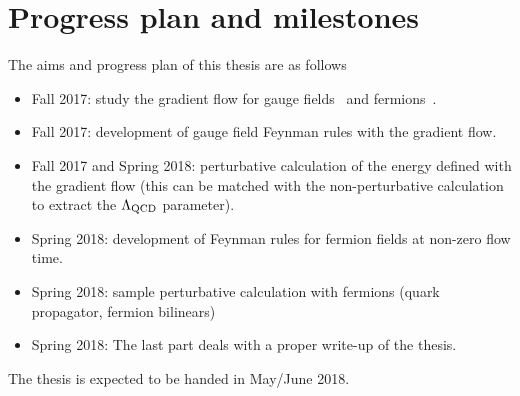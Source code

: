 \documentclass[aps,prc,twocolumn,showpacs,floatfix,nofootinbib,preprintnumbers,superscriptaddress,amsmath,amssymb]{revtex4-1}
\begin{document}
\section*{Progress plan and milestones}
The aims and progress plan of this thesis are as follows
\begin{itemize}
\item Fall 2017: study the gradient flow for gauge fields~\cite{Luscher:2010iy} and fermions~\cite{Luscher:2013cpa}.
\item Fall 2017: development of gauge field Feynman rules with the gradient flow.
\item Fall 2017 and Spring 2018: perturbative calculation of the energy defined with the gradient flow (this can be matched
with the non-perturbative calculation to extract the $\Lambda_{\rm QCD}$ parameter).
\item Spring 2018: development of Feynman rules for fermion fields at non-zero flow time.
\item Spring 2018: sample perturbative calculation with fermions (quark propagator, fermion bilinears)
\item Spring 2018: The last part deals with a proper write-up of the thesis. 
\end{itemize}
 

The thesis is expected to be handed in May/June 2018.


%

\end{document}
